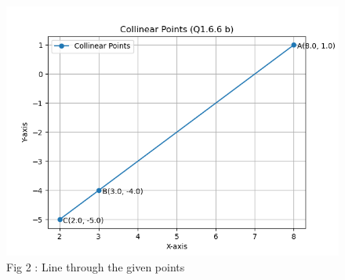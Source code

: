 \documentclass[journal,12pt,onecolumn]{IEEEtran}
\theoremstyle{remark}
\begin{document}
\begin{figure}[h!]
  \centering
  \includegraphics[width=0.5\columnwidth]{figs/fig_b.png} 
   \caption*{Fig 2 : Line through the given points}
  \label{Fig2}
\end{figure}
\end{document}

